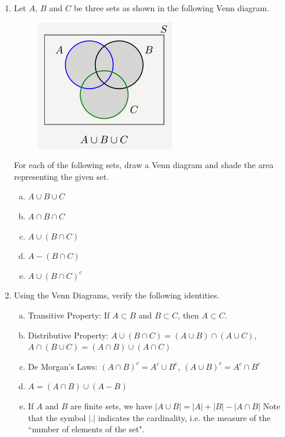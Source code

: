 \documentclass[12pt,thmsa]{article}\usepackage[]{graphicx}\usepackage[]{color}
\begin{document}
\begin{enumerate}
\item Let $ A $, $ B $ and $ C $ be three sets as shown in the following Venn diagram.\\
\begin{figure}[h!]
\begin{center}
\includegraphics[scale=1]{Capture.png}
\end{center}
\end{figure}
\newline
For each of the following sets, draw a Venn diagram and shade the area representing the given set.
\begin{enumerate}[a)]
\item $ A \cup B \cup C $
\item $ A \cap B \cap C $
\item $ A \cup (B \cap C) $
\item $ A - (B \cap C) $
\item $ A \cup (B \cap C)^{c} $
\end{enumerate}


\item Using the Venn Diagrams, verify the following identities.
\begin{enumerate}[a)]
\item Transitive Property: If $A \subset B$ and $B \subset C$, then $A \subset C$. \\
\item Distributive Property: $A \cup (B \cap C) = (A \cup B) \cap (A \cup C)$, $A \cap (B \cup C) = (A \cap B) \cup (A \cap C) $ \\
\item De Morgan's Laws: $(A \cap B)^c = A^c \cup B^c $, $(A \cup B)^c = A^c \cap B^c $\\
\item $ A=(A \cap B) \cup (A-B) $
\item If $ A $ and $ B $ are finite sets, we have $ |A \cup B|=|A|+|B|-|A \cap B| $
\subitem Note that the symbol $ | . | $ indicates the cardinality, i.e. the measure of the ``number of elements of the set".
\end{enumerate}


\end{enumerate}
\end{document}
